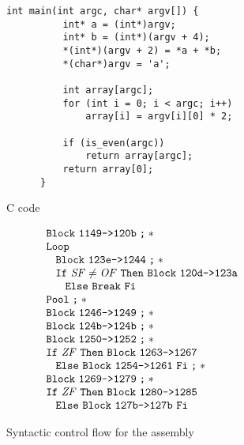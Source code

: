 \begin{figure}
  \begin{subfigure}[b]{.53\linewidth}
    \begin{lstlisting}[style=C, gobble=6]
      int main(int argc, char* argv[]) {
          int* a = (int*)argv;
          int* b = (int*)(argv + 4);
          *(int*)(argv + 2) = *a + *b;
          *(char*)argv = 'a';

          int array[argc];
          for (int i = 0; i < argc; i++)
              array[i] = argv[i][0] * 2;

          if (is_even(argc))
              return array[argc];
          return array[0];
      }
    \end{lstlisting}
    \caption{C code}\label{fig:example2-c}
  \end{subfigure}%
  \hfill
  \begin{subfigure}[b]{.46\linewidth}
    \begin{equation*}
      \begin{array}{l}
        \ABB~\Block{1149}{120b}\ASeq* \\
        \AWhile \\
        \ind{2ex}\ABB~\Block{123e}{1244}\ASeq* \\
        \ind{2ex}\AIf~\var{SF}\neq\var{OF}~\AThen~\ABB~\Block{120d}{123a} \\
        \ind{4ex}\AElse~\ABreak~\AFi \\
        \AOd\ASeq* \\
        \ABB~\Block{1246}{1249}\ASeq* \\
        \ABB~\Block{124b}{124b}\ASeq* \\
        \ABB~\Block{1250}{1252}\ASeq* \\
        \AIf~\var{ZF}~\AThen~\ABB~\Block{1263}{1267} \\
        \ind{2ex}\AElse~\ABB~\Block{1254}{1261}~\AFi\ASeq* \\
        \ABB~\Block{1269}{1279}\ASeq* \\
        \AIf~\var{ZF}~\AThen~\ABB~\Block{1280}{1285} \\
        \ind{2ex}\AElse~\ABB~\Block{127b}{127b}~\AFi
      \end{array}
    \end{equation*}
    \caption{Syntactic control flow for the assembly}\label{fig:example2-scf}
  \end{subfigure}
  \begin{subfigure}{\linewidth}
    \begin{align*}

\end{align*}
\end{subfigure}
\end{figure}
